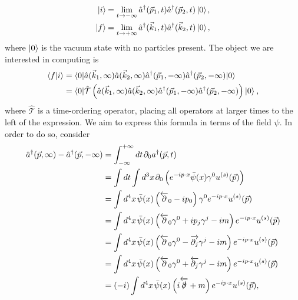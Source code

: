 \begin{subequations}
\begin{align}
\mathinner{\lvert i\rangle}_{\hspace{-0.1em}} &= \lim_{t \to -\infty} \hat{a}^\dagger(\vec{p}_1,t) \hat{a}^\dagger(\vec{p}_2 ,t) \mathinner{\lvert0\rangle}_{\hspace{-0.1em}}, \\ 
\mathinner{\lvert f\rangle}_{\hspace{-0.1em}} &= \lim_{t \to +\infty} \hat{a}^\dagger(\vec{k}_1,t) \hat{a}^\dagger(\vec{k}_2 ,t) \mathinner{\lvert0\rangle}_{\hspace{-0.1em}},
\end{align}
\end{subequations}
where $\mathinner{\lvert0\rangle}_{\hspace{-0.1em}}$ is the vacuum state with no particles present. The object we are interested in computing is
\begin{equation}
\begin{split}
\left< f | i \right> &= \mathinner{\langle0\vert\hat{a}(\vec{k}_1,\infty) \hat{a}(\vec{k}_2 ,\infty) \hat{a}^\dagger(\vec{p}_1,-\infty) \hat{a}^\dagger(\vec{p}_2 ,-\infty)\vert0\rangle}_{} \\
& = \mathinner{\langle0\vert\hat{\mathcal{T}} \left(\hat{a}(\vec{k}_1,\infty) \hat{a}(\vec{k}_2 ,\infty) \hat{a}^\dagger(\vec{p}_1,-\infty) \hat{a}^\dagger(\vec{p}_2 ,-\infty) \right)\vert0\rangle}_{},
\end{split}
\end{equation}
where $\hat{\mathcal{T}}$ is a time-ordering operator, placing all operators at larger times to the left of the expression. We aim to express this formula in terms of the field $\psi$. In order to do so, consider
\begin{equation}
\begin{split}
\hat{a}^\dagger(\vec{p},\infty) - \hat{a}^\dagger(\vec{p},-\infty) &= \int_{- \infty}^{+ \infty} dt \hspace{1pt} \partial_0 a^\dagger(\vec{p},t) \\
&=  \int dt \int d^3 x \hspace{1pt} \partial_0 \left( e^{- i p \cdot x} \bar{\psi}(x) \gamma^0 u^{(s)}(\vec{p}) \right) \\
&= \int d^4 x \hspace{1pt} \bar{\psi}(x) \left(\overleftarrow{\partial}_0 - i p_0 \right) \gamma^0 e^{- i p \cdot x} u^{(s)}(\vec{p}) \\
&=  \int d^4 x \hspace{1pt} \bar{\psi}(x) \left(\overleftarrow{\partial}_0 \gamma^0 + i p_j \gamma^j - im \right) e^{- i p \cdot x} u^{(s)}(\vec{p}) \\
&=  \int d^4 x \hspace{1pt} \bar{\psi}(x) \left(\overleftarrow{\partial}_0 \gamma^0 - \overrightarrow{\partial_j} \gamma^j - im \right) e^{- i p \cdot x} u^{(s)}(\vec{p}) \\
&=  \int d^4 x \hspace{1pt} \bar{\psi}(x) \left(\overleftarrow{\partial}_0 \gamma^0 + \overleftarrow{\partial_j} \gamma^j - im \right) e^{- i p \cdot x} u^{(s)}(\vec{p}) \\
&=  (-i) \int d^4 x \hspace{1pt} \bar{\psi}(x) \left(i \overleftarrow{\slashed{\partial}} + m \right) e^{- i p \cdot x} u^{(s)}(\vec{p}),
\end{split}
\end{equation}
